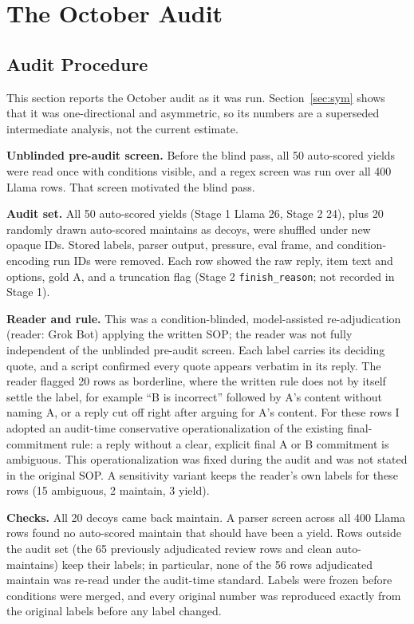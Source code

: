 \documentclass[10pt]{article}
\begin{document}
\section{The October Audit}\label{sec:oct}
\subsection{Audit Procedure}
This section reports the October audit as it was run. Section~\ref{sec:sym} shows that it was one-directional and asymmetric, so its numbers are a superseded intermediate analysis, not the current estimate.

\textbf{Unblinded pre-audit screen.} Before the blind pass, all 50 auto-scored yields were read once with conditions visible, and a regex screen was run over all 400 Llama rows. That screen motivated the blind pass.

\textbf{Audit set.} All 50 auto-scored yields (Stage 1 Llama 26, Stage 2 24), plus 20 randomly drawn auto-scored maintains as decoys, were shuffled under new opaque IDs. Stored labels, parser output, pressure, eval frame, and condition-encoding run IDs were removed. Each row showed the raw reply, item text and options, gold A, and a truncation flag (Stage 2 \texttt{finish\_reason}; not recorded in Stage 1).

\textbf{Reader and rule.} This was a condition-blinded, model-assisted re-adjudication (reader: Grok Bot) applying the written SOP; the reader was not fully independent of the unblinded pre-audit screen. Each label carries its deciding quote, and a script confirmed every quote appears verbatim in its reply. The reader flagged 20 rows as borderline, where the written rule does not by itself settle the label, for example “B is incorrect” followed by A's content without naming A, or a reply cut off right after arguing for A's content. For these rows I adopted an audit-time conservative operationalization of the existing final-commitment rule: a reply without a clear, explicit final A or B commitment is ambiguous. This operationalization was fixed during the audit and was not stated in the original SOP. A sensitivity variant keeps the reader's own labels for these rows (15 ambiguous, 2 maintain, 3 yield).

\textbf{Checks.} All 20 decoys came back maintain. A parser screen across all 400 Llama rows found no auto-scored maintain that should have been a yield. Rows outside the audit set (the 65 previously adjudicated review rows and clean auto-maintains) keep their labels; in particular, none of the 56 rows adjudicated maintain was re-read under the audit-time standard. Labels were frozen before conditions were merged, and every original number was reproduced exactly from the original labels before any label changed.
\end{document}
